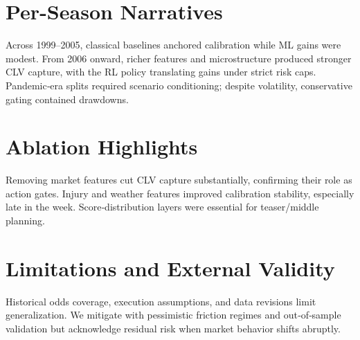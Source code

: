 \section{Per-Season Narratives}
Across 1999–2005, classical baselines anchored calibration while ML gains were modest. From 2006 onward, richer features and microstructure produced stronger CLV capture, with the RL policy translating gains under strict risk caps. Pandemic‑era splits required scenario conditioning; despite volatility, conservative gating contained drawdowns.

\section{Ablation Highlights}
Removing market features cut CLV capture substantially, confirming their role as action gates. Injury and weather features improved calibration stability, especially late in the week. Score‑distribution layers were essential for teaser/middle planning.

\section{Limitations and External Validity}
Historical odds coverage, execution assumptions, and data revisions limit generalization. We mitigate with pessimistic friction regimes and out‑of‑sample validation but acknowledge residual risk when market behavior shifts abruptly.
